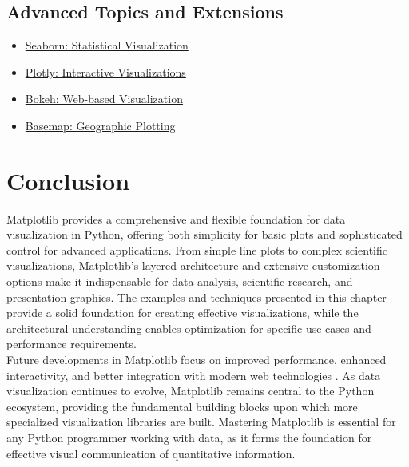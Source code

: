 \subsection{Advanced Topics and Extensions}
\begin{itemize}
	\item \href{https://seaborn.pydata.org/}{Seaborn: Statistical Visualization}
	\item \href{https://plotly.com/python/}{Plotly: Interactive Visualizations}
	\item \href{https://bokeh.org/}{Bokeh: Web-based Visualization}
	\item \href{https://matplotlib.org/basemap/}{Basemap: Geographic Plotting} \cite{VanderPlas:2016}
\end{itemize}

\section{Conclusion}
\label{sec:matplotlib_conclusion}

Matplotlib provides a comprehensive and flexible foundation for data visualization in Python, offering both simplicity for basic plots and sophisticated control for advanced applications. From simple line plots to complex scientific visualizations, Matplotlib's layered architecture and extensive customization options make it indispensable for data analysis, scientific research, and presentation graphics. The examples and techniques presented in this chapter provide a solid foundation for creating effective visualizations, while the architectural understanding enables optimization for specific use cases and performance requirements.\\

Future developments in Matplotlib focus on improved performance, enhanced interactivity, and better integration with modern web technologies \cite{Droettboom:2021}. As data visualization continues to evolve, Matplotlib remains central to the Python ecosystem, providing the fundamental building blocks upon which more specialized visualization libraries are built. Mastering Matplotlib is essential for any Python programmer working with data, as it forms the foundation for effective visual communication of quantitative information.